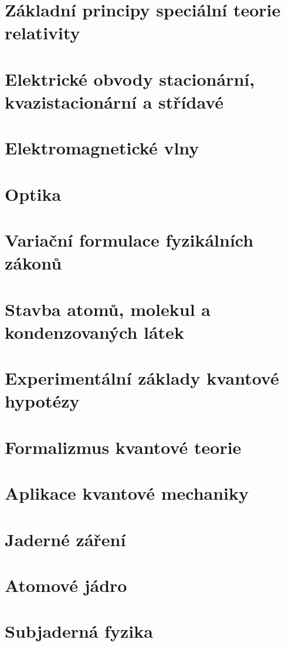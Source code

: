 \documentclass[12pt,a4paper, hidelinks]{report}
\let\openright=\clearpage
\begin{document}
\chapter{Základní principy speciální teorie relativity}
\chapter{Elektrické obvody stacionární, kvazistacionární a střídavé}
\chapter{Elektromagnetické vlny}
\chapter{Optika}
\chapter{Variační formulace fyzikálních zákonů}
\chapter{Stavba atomů, molekul a kondenzovaných látek}
\chapter{Experimentální základy kvantové hypotézy}
\chapter{Formalizmus kvantové teorie}
\chapter{Aplikace kvantové mechaniky}
\chapter{Jaderné záření}
\chapter{Atomové jádro}
\chapter{Subjaderná fyzika}
\openright
\end{document}
